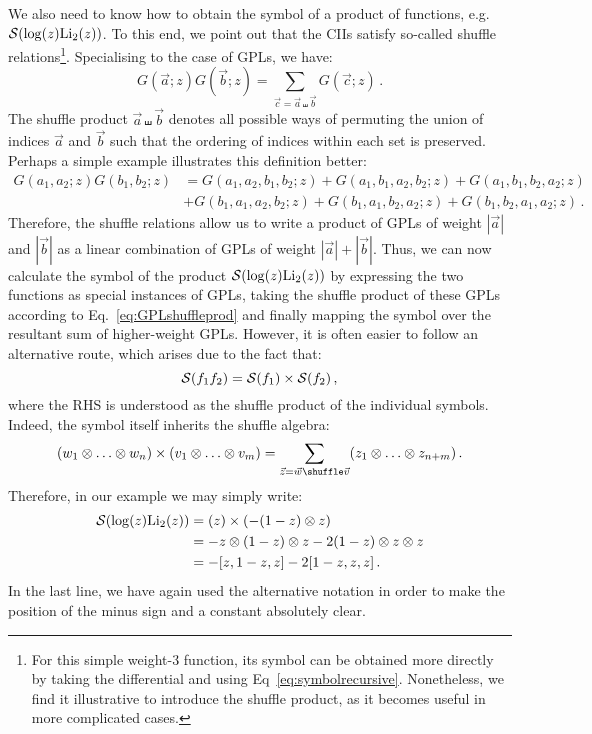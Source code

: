 \documentclass[main.tex]{subfiles}
\begin{document}
We also need to know how to obtain the symbol of a product of functions, e.g. $\mathcal{S}(\log(z) \text{Li}_2(z))$. To this end, we point out that the CIIs satisfy so-called shuffle relations\footnote{For this simple weight-3 function, its symbol can be obtained more directly by taking the differential and using Eq~\ref{eq:symbolrecursive}. Nonetheless, we find it illustrative to introduce the shuffle product, as it becomes useful in more complicated cases.}. Specialising to the case of GPLs, we have:
\begin{equation} \label{eq:GPLshuffleprod}
    G(\vec{a};z)G(\vec{b};z) = \sum_{\vec{c}=\vec{a} \shuffle \vec{b}} G(\vec{c};z)\,.
\end{equation}
The shuffle product $\vec{a} \shuffle \vec{b}$ denotes all possible ways of permuting the union of indices $\vec{a}$ and $\vec{b}$ such that the ordering of indices within each set is preserved. Perhaps a simple example illustrates this definition better:
\begin{align} \label{eq:shuffleexample}
    G(a_1,a_2;z) G(b_1,b_2;z) &= G(a_1,a_2,b_1,b_2;z) + G(a_1,b_1,a_2,b_2;z) + G(a_1,b_1,b_2,a_2;z) \nonumber \\ 
    & + G(b_1,a_1,a_2,b_2;z) + G(b_1,a_1,b_2,a_2;z) + G(b_1,b_2,a_1,a_2;z)\,.
\end{align}
Therefore, the shuffle relations allow us to write a product of GPLs of weight $|\vec{a}|$ and $|\vec{b}|$ as a linear combination of GPLs of weight $|\vec{a}|+|\vec{b}|$. Thus, we can now calculate the symbol of the product $\mathcal{S}(\log(z) \text{Li}_2(z))$ by expressing the two functions as special instances of GPLs, taking the shuffle product of these GPLs according to Eq.~\ref{eq:GPLshuffleprod} and finally mapping the symbol over the resultant sum of higher-weight GPLs. However, it is often easier to follow an alternative route, which arises due to the fact that:
\begin{equation}
    \mathcal{S}(f_1 f_2) = \mathcal{S}(f_1) \times \mathcal{S}(f_2)\,,
\end{equation}
where the RHS is understood as the shuffle product of the individual symbols. Indeed, the symbol itself inherits the shuffle algebra:
\begin{equation} \label{eq:symbolshuffle}
    (w_1 \oo \ldots \oo w_n) \times (v_1 \oo \ldots \oo v_m) = \sum_{\vec{z}=\vec{w} \shuffle \vec{v}} (z_1 \oo \ldots \oo z_{n+m})\,.
\end{equation}
Therefore, in our example we may simply write: 
\begin{align}
    \mathcal{S}(\log(z) \text{Li}_2(z)) &= (z) \times (-(1-z)\otimes z) \nonumber \\
    &= -z \otimes (1-z) \otimes z - 2 (1-z) \otimes z \otimes z \\
    &= -[z, 1-z, z] -2[1-z, z, z] \,. \nonumber
\end{align}
In the last line, we have again used the alternative notation in order to make the position of the minus sign and a constant absolutely clear.
\end{document}
